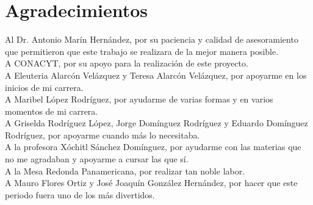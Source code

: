 \chapter*{\centering Agradecimientos}

Al Dr. Antonio Marín Hernández, por su paciencia y calidad de asesoramiento que permitieron que este trabajo se realizara de la mejor manera posible.\\

A CONACYT, por su apoyo para la realización de este proyecto.\\

A Eleuteria Alarcón Velázquez y Teresa Alarcón Velázquez, por apoyarme en los inicios de mi carrera.\\

A Maribel López Rodríguez, por ayudarme de varias formas y en varios momentos de mi carrera.\\

A Griselda Rodríguez López, Jorge Domínguez Rodríguez y Eduardo Domínguez Rodríguez, por apoyarme cuando más lo necesitaba.\\

A la profesora Xóchitl Sánchez Domínguez, por ayudarme con las materias que no me agradaban y apoyarme a cursar las que sí.\\

A la Mesa Redonda Panamericana, por realizar tan noble labor.\\

A Mauro Flores Ortiz y José Joaquín González Hernández, por hacer que este periodo fuera uno de los más divertidos.